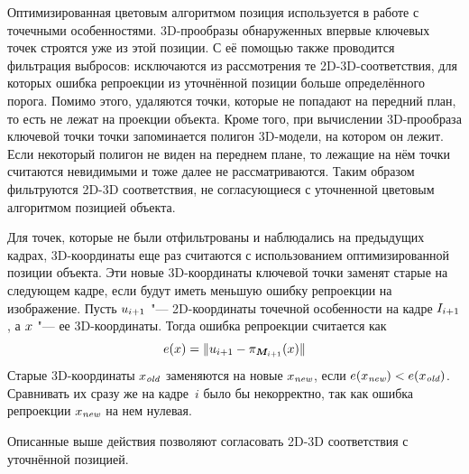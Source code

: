 Оптимизированная цветовым алгоритмом позиция используется в работе с точечными
особенностями.
3D-прообразы обнаруженных впервые ключевых точек строятся уже из этой позиции.
С её помощью также проводится фильтрация выбросов: исключаются из рассмотрения те 2D-3D-соответствия, для
которых ошибка репроекции из уточнённой позиции больше определённого порога.
Помимо этого, удаляются точки, которые не попадают на передний план, то есть не
лежат на проекции объекта.
Кроме того, при вычислении 3D-прообраза ключевой точки точки запоминается
полигон 3D-модели, на котором он лежит.
Если некоторый полигон не виден на переднем плане, то лежащие на нём точки
считаются невидимыми и тоже далее не рассматриваются.
Таким образом фильтруются 2D-3D соответствия, не согласующиеся с уточненной
цветовым алгоритмом позицией объекта.

Для точек, которые не были отфильтрованы и наблюдались на предыдущих кадрах, 3D-координаты еще раз считаются с
использованием оптимизированной позиции объекта.
Эти новые 3D-координаты ключевой точки заменят старые на следующем кадре, если
будут иметь меньшую ошибку репроекции на изображение.
Пусть $\mathnormal{u}_{i + 1}$ "--- 2D-координаты точечной особенности на кадре
$I_{i + 1}$, а $\mathnormal{x}$ "--- ее 3D-координаты.
Тогда ошибка репроекции считается как
\begin{equation}\label{eqn:err_reproj}
    \mathnormal{e}( \mathnormal{x} ) = \| \mathnormal{u}_{i + 1} - \pi_{\bm{M}_{i + 1}}(\mathnormal{x}) \|
\end{equation}
Старые 3D-координаты $\mathnormal{x}_{\text {\it old}}$ заменяются на новые $\mathnormal{x}_{\text{\it new}}$, если
$\mathnormal{e}( \mathnormal{x}_{\text{\it new}} ) < \mathnormal{e}( \mathnormal{x}_{\text {\it old}} )$.
Сравнивать их сразу же на кадре~$i$ было бы некорректно, так как ошибка
репроекции $\mathnormal{x}_{\text{\it new}}$ на нем нулевая.

Описанные выше действия позволяют согласовать 2D-3D соответствия с уточнённой
позицией.
